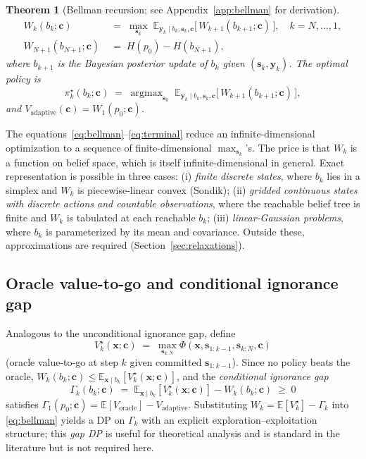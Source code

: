 \documentclass[11pt,a4paper]{article}
\newcommand{\E}{\mathbb{E}}
\newcommand{\argmax}{\operatorname{argmax}}
\newtheorem{theorem}{Theorem}
\begin{document}
\begin{theorem}[Bellman recursion; see Appendix~\ref{app:bellman} for derivation]
\begin{align}
  W_k(b_k; \bm{c}) &\;=\; \max_{\bm{s}_k}\; \E_{\bm{y}_k \mid b_k, \bm{s}_k, \bm{c}}\!\bigl[\,W_{k+1}(b_{k+1}; \bm{c})\,\bigr], \quad k = N, \ldots, 1, \label{eq:bellman}\\
  W_{N+1}(b_{N+1}; \bm{c}) &\;=\; H(p_0) - H(b_{N+1}), \label{eq:terminal}
\end{align}
where $b_{k+1}$ is the Bayesian posterior update of $b_k$ given $(\bm{s}_k, \bm{y}_k)$.  The optimal policy is
\begin{equation}
  \pi^\star_k(b_k; \bm{c}) \;=\; \argmax_{\bm{s}_k}\; \E_{\bm{y}_k \mid b_k, \bm{s}_k, \bm{c}}\!\bigl[\,W_{k+1}(b_{k+1}; \bm{c})\,\bigr],
  \label{eq:pi_star}
\end{equation}
and $V_{\mathrm{adaptive}}(\bm{c}) = W_1(p_0; \bm{c})$.
\end{theorem}

The equations~\eqref{eq:bellman}--\eqref{eq:terminal} reduce an infinite-dimensional optimization to a sequence of finite-dimensional $\max_{\bm{s}_k}$'s.  The price is that $W_k$ is a function on belief space, which is itself infinite-dimensional in general.  Exact representation is possible in three cases: (i) \emph{finite discrete states}, where $b_k$ lies in a simplex and $W_k$ is piecewise-linear convex (Sondik); (ii) \emph{gridded continuous states with discrete actions and countable observations}, where the reachable belief tree is finite and $W_k$ is tabulated at each reachable $b_k$; (iii) \emph{linear-Gaussian problems}, where $b_k$ is parameterized by its mean and covariance.  Outside these, approximations are required (Section~\ref{sec:relaxations}).

\subsection{Oracle value-to-go and conditional ignorance gap}

Analogous to the unconditional ignorance gap, define
\begin{equation}
  V_k^\star(\bm{x}; \bm{c}) \;=\; \max_{\bm{s}_{k:N}} \Phi(\bm{x}, \bm{s}_{1:k-1}, \bm{s}_{k:N}, \bm{c})
  \label{eq:oracle_vtg}
\end{equation}
(oracle value-to-go at step $k$ given committed $\bm{s}_{1:k-1}$).  Since no policy beats the oracle, $W_k(b_k; \bm{c}) \le \E_{\bm{x}\mid b_k}[V_k^\star(\bm{x}; \bm{c})]$, and the \emph{conditional ignorance gap}
\begin{equation}
  \Gamma_k(b_k; \bm{c}) \;=\; \E_{\bm{x}\mid b_k}[V_k^\star(\bm{x}; \bm{c})] - W_k(b_k; \bm{c}) \;\ge\; 0
\end{equation}
satisfies $\Gamma_1(p_0; \bm{c}) = \E[V_{\mathrm{oracle}}] - V_{\mathrm{adaptive}}$.  Substituting $W_k = \E[V_k^\star] - \Gamma_k$ into \eqref{eq:bellman} yields a DP on $\Gamma_k$ with an explicit exploration--exploitation structure; this \emph{gap DP} is useful for theoretical analysis and is standard in the literature but is not required here.
\end{document}
